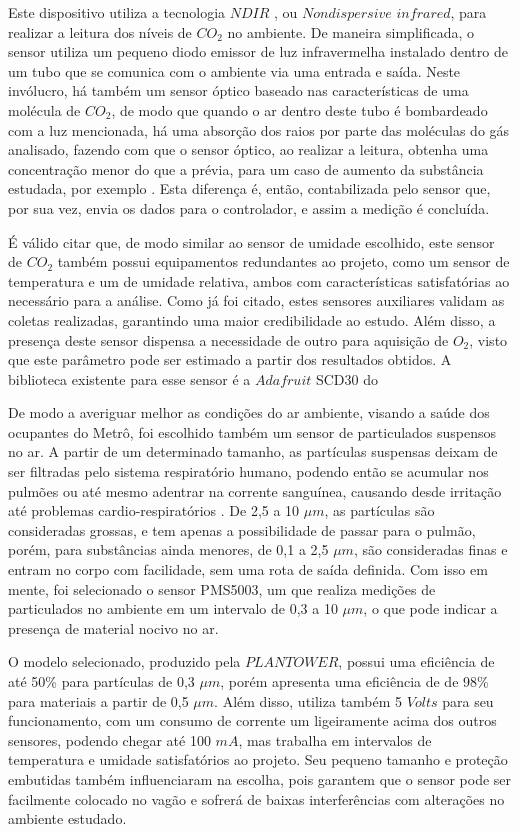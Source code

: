 \documentclass[acronym,symbols]{fei}
\begin{document}
Este dispositivo utiliza a tecnologia $NDIR$ , ou $Nondispersive$ $infrared$, para realizar a leitura dos níveis de $CO_2$ no ambiente. De maneira simplificada, o sensor utiliza um pequeno diodo emissor de luz infravermelha instalado dentro de um tubo que se comunica com o ambiente via uma entrada e saída.  Neste invólucro, há também um sensor óptico baseado nas características de uma molécula de $CO_2$,  de modo que quando o ar dentro deste tubo é bombardeado com a luz mencionada, há uma absorção dos raios por parte das moléculas do gás analisado, fazendo com que o sensor óptico, ao realizar a leitura, obtenha uma concentração menor do que a prévia, para um caso de aumento da substância estudada, por exemplo \cite{NDIR}. Esta diferença é, então, contabilizada pelo sensor que, por sua vez, envia os dados para o controlador, e assim a medição é concluída.

É válido citar que, de modo similar ao sensor de umidade escolhido, este sensor de $CO_2$ também possui equipamentos redundantes ao projeto, como um sensor de temperatura e um de umidade relativa, ambos com características satisfatórias ao necessário para a análise. Como já foi citado, estes sensores auxiliares validam as coletas realizadas, garantindo uma maior credibilidade ao estudo. Além disso, a presença deste sensor dispensa a necessidade de outro para aquisição de $O_2$, visto que este parâmetro pode ser estimado a partir dos resultados obtidos. A biblioteca existente para esse sensor é a $Adafruit$ SCD30 do \textcite{Adafruit_SCD30} 

De modo a averiguar melhor as condições do ar ambiente, visando a saúde dos ocupantes do Metrô, foi escolhido também um sensor de particulados suspensos no ar. A partir de um determinado tamanho, as partículas suspensas deixam de ser filtradas pelo sistema respiratório humano, podendo então se acumular nos pulmões ou até mesmo adentrar na corrente sanguínea, causando desde irritação até problemas cardio-respiratórios \cite{pm25}. De 2,5 a 10 $\mu$$m$, as partículas são consideradas grossas, e tem apenas a possibilidade de passar para o pulmão, porém, para substâncias ainda menores, de 0,1 a 2,5 $\mu$$m$, são consideradas finas e entram no corpo com facilidade, sem uma rota de saída definida. Com isso em mente, foi selecionado o sensor PMS5003, um que realiza medições de particulados no ambiente em um intervalo de 0,3 a 10 $\mu$$m$, o que pode indicar a presença de material nocivo no ar.

O modelo selecionado, produzido pela $PLANTOWER$, possui uma eficiência de até 50\% para partículas de 0,3 $\mu$$m$, porém apresenta uma eficiência de de 98\% para materiais a partir de 0,5 $\mu$$m$. Além disso, utiliza também 5 $Volts$ para seu funcionamento, com um consumo de corrente um ligeiramente acima dos outros sensores, podendo chegar até 100 $mA$, mas trabalha em intervalos de temperatura e umidade satisfatórios ao projeto. Seu pequeno tamanho e proteção embutidas também influenciaram na escolha, pois garantem que o sensor pode ser facilmente colocado no vagão e sofrerá de baixas interferências com alterações no ambiente estudado.
\end{document}
